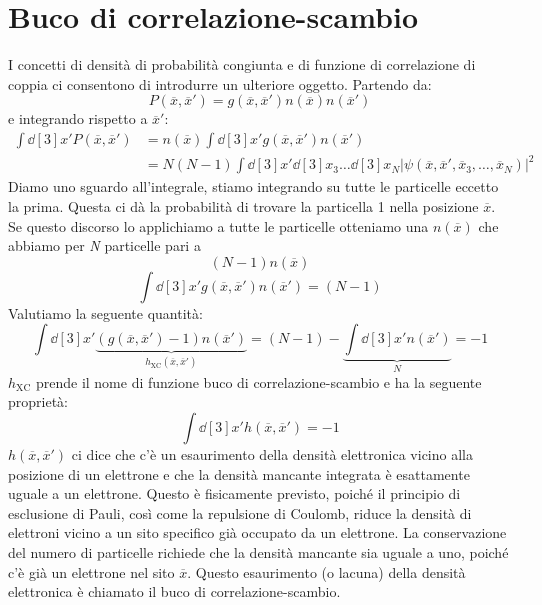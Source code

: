 \section{Buco di correlazione-scambio}
I concetti di densità di probabilità congiunta e di funzione di correlazione di coppia ci consentono di introdurre un ulteriore oggetto. Partendo da:
\begin{equation*}
    P(\overline x, \overline{x}')=g(\overline x, \overline{x}')n(\overline x)n(\overline{x}')
\end{equation*}
e integrando rispetto a $\overline{x}'$:
\begin{equation*}
    \begin{aligned}
        \int \dd[3]{x'}P(\overline x, \overline{x}') &= n(\overline x)\int \dd[3]{x'} g(\overline x, \overline{x}')n(\overline{x}') \\
        & = N(N-1)\int\dd[3]{x'}\dd[3]{x}_3\dots\dd[3]{x}_N|\psi(\overline x, \overline{x}', \overline{x}_3, \dots, \overline{x}_N)|^2
    \end{aligned}
\end{equation*}
Diamo uno sguardo all'integrale, stiamo integrando su tutte le particelle eccetto la prima. Questa ci dà la probabilità di trovare la particella 1 nella posizione $\overline x$. Se questo discorso lo applichiamo a tutte le particelle otteniamo una $n(\overline x)$ che abbiamo per \textit{N} particelle pari a
\begin{equation*}
    (N-1)n(\overline x)
\end{equation*}
\begin{equation*}
    \int \dd[3]{x'}g(\overline x, \overline{x}')n(\overline{x}')=(N-1)
\end{equation*}
Valutiamo la seguente quantità:
\begin{equation*}
    \int \dd[3]{x'}\underbrace{(g(\overline x, \overline{x}')-1)n(\overline{x}')}_{h_{\text{XC}}(\overline x, \overline{x}')}=(N-1)-\underbrace{\int \dd[3]{x'}n(\overline{x}')}_{N}=-1
\end{equation*}
$h_{\text{XC}}$ prende il nome di funzione buco di correlazione-scambio e ha la seguente proprietà:
\begin{equation*}
    \int \dd[3]{x'}h(\overline x, \overline{x}')=-1
\end{equation*}
$h(\overline x, \overline{x}')$ ci dice che c'è un esaurimento della densità elettronica vicino alla posizione di un elettrone e che la densità mancante integrata è esattamente uguale a un elettrone. Questo è fisicamente previsto, poiché il principio di esclusione di Pauli, così come la repulsione di Coulomb, riduce la densità di elettroni vicino a un sito specifico già occupato da un elettrone. La conservazione del numero di particelle richiede che la densità mancante sia uguale a uno, poiché c'è già un elettrone nel sito $\overline x$. Questo esaurimento (o lacuna) della densità elettronica è chiamato il buco di correlazione-scambio. \\
